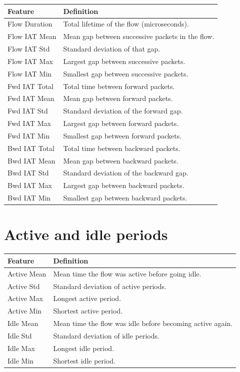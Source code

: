 \begin{tabularx}{\textwidth}{lX}
  \toprule
  \textbf{Feature} & \textbf{Definition} \\
  \midrule
  Flow Duration   & Total lifetime of the flow (microseconds). \\
  Flow IAT Mean   & Mean gap between successive packets in the flow. \\
  Flow IAT Std    & Standard deviation of that gap. \\
  Flow IAT Max    & Largest gap between successive packets. \\
  Flow IAT Min    & Smallest gap between successive packets. \\
  Fwd IAT Total   & Total time between forward packets. \\
  Fwd IAT Mean    & Mean gap between forward packets. \\
  Fwd IAT Std     & Standard deviation of the forward gap. \\
  Fwd IAT Max     & Largest gap between forward packets. \\
  Fwd IAT Min     & Smallest gap between forward packets. \\
  Bwd IAT Total   & Total time between backward packets. \\
  Bwd IAT Mean    & Mean gap between backward packets. \\
  Bwd IAT Std     & Standard deviation of the backward gap. \\
  Bwd IAT Max     & Largest gap between backward packets. \\
  Bwd IAT Min     & Smallest gap between backward packets. \\
  \bottomrule
\end{tabularx}

\section{Active and idle periods}
\label{app:feat_activeidle}

\begin{tabularx}{\textwidth}{lX}
  \toprule
  \textbf{Feature} & \textbf{Definition} \\
  \midrule
  Active Mean & Mean time the flow was active before going idle. \\
  Active Std  & Standard deviation of active periods. \\
  Active Max  & Longest active period. \\
  Active Min  & Shortest active period. \\
  Idle Mean   & Mean time the flow was idle before becoming active again. \\
  Idle Std    & Standard deviation of idle periods. \\
  Idle Max    & Longest idle period. \\
  Idle Min    & Shortest idle period. \\
  \bottomrule
\end{tabularx}

